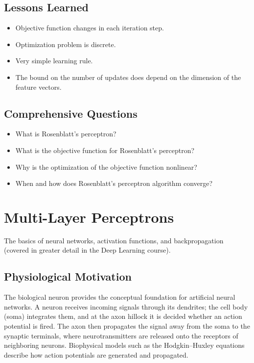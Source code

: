 \subsection{Lessons Learned}

  \begin{itemize}
    \item Objective function changes in each iteration step. 
    \item Optimization problem is discrete.
    \item Very simple learning rule.
    \item \vorsicht {} The bound on the number of updates does  depend on the dimension of the feature vectors.
  \end{itemize}
 
\subsection{Comprehensive Questions}

  \begin{itemize}
    \item What is Rosenblatt's perceptron? 
    \item What is the objective function for Rosenblatt's perceptron? 
    \item Why is the optimization of the objective function nonlinear? 
    \item When and how does Rosenblatt's perceptron algorithm converge?
  \end{itemize}
 
 \newpage
\section{Multi-Layer Perceptrons}

The basics of neural networks, activation functions, and backpropagation (covered in greater detail in the Deep Learning course).\autocite{bishop2006,hastie2009}

\subsection{Physiological Motivation}

The biological neuron provides the conceptual foundation for artificial neural networks. A neuron receives incoming signals through its dendrites; the cell body (soma) integrates them, and at the axon hillock it is decided whether an action potential is fired. The axon then propagates the signal away from the soma to the synaptic terminals, where neurotransmitters are released onto the receptors of neighboring neurons. Biophysical models such as the Hodgkin--Huxley equations describe how action potentials are generated and propagated.


